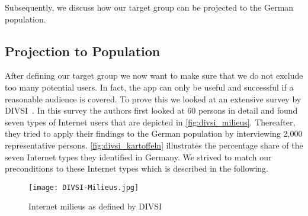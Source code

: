Subsequently, we discuss how our target group can be projected to the German population.

\subsection{Projection to Population}
After defining our target group we now want to make sure that we do not exclude too many potential users.
In fact, the app can only be useful and successful if a reasonable audience is covered.
To prove this we looked at an extensive survey by DIVSI~\cite{divsi2012divsi}.
In this survey the authors first looked at 60 persons in detail and found seven types of Internet users that are depicted in \autoref{fig:divsi_milieus}.
Thereafter, they tried to apply their findings to the German population by interviewing 2,000 representative persons.
\autoref{fig:divsi_kartoffeln} illustrates the percentage share of the seven Internet types they identified in Germany.
We strived to match our preconditions to these Internet types which is described in the following.

\begin{figure}[hHtbp]
\centering
\texttt{[image: DIVSI-Milieus.jpg]}
\caption{Internet milieus as defined by DIVSI~\cite{divsi2012divsi}}
\label{fig:divsi_milieus}
\end{figure}

